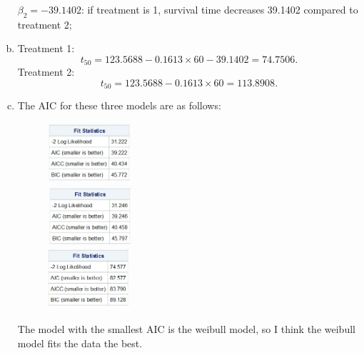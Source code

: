 \documentclass{elegantbook}
\begin{document}
\begin{solution}
\begin{enumerate}[(a)]
    $\beta_2=-39.1402$: if treatment is 1, survival time decreases 39.1402 compared to treatment 2; 
    \item Treatment 1:
    \[ t_{50} = 123.5688 - 0.1613 \times 60 - 39.1402 = 74.7506. \]
    Treatment 2: 
    \[t_{50} = 123.5688 - 0.1613 \times 60 = 113.8908. \]
    \item The AIC for these three models are as follows: 
    \begin{figure}[H]
        \centering
        \includegraphics[width=0.3\textwidth]{HW10_3_1.png}\\
        \includegraphics[width=0.3\textwidth]{HW10_3_2.png}\\
        \includegraphics[width=0.3\textwidth]{HW10_3_3.png}
    \end{figure}
    The model with the smallest AIC is the weibull model, so I think the weibull model fits the data the best.
\end{enumerate}
\end{solution}
\end{document}
